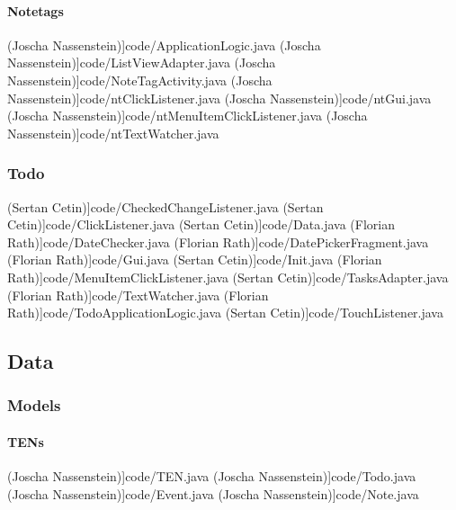 		\paragraph{Notetags}
 (Joscha Nassenstein)]{code/ApplicationLogic.java}
 (Joscha Nassenstein)]{code/ListViewAdapter.java}
 (Joscha Nassenstein)]{code/NoteTagActivity.java}
 (Joscha Nassenstein)]{code/ntClickListener.java}
 (Joscha Nassenstein)]{code/ntGui.java}
 (Joscha Nassenstein)]{code/ntMenuItemClickListener.java}
 (Joscha Nassenstein)]{code/ntTextWatcher.java}
	\subsubsection{Todo}
 (Sertan Cetin)]{code/CheckedChangeListener.java}
 (Sertan Cetin)]{code/ClickListener.java}
 (Sertan Cetin)]{code/Data.java}
 (Florian Rath)]{code/DateChecker.java}
 (Florian Rath)]{code/DatePickerFragment.java}
 (Florian Rath)]{code/Gui.java}
 (Sertan Cetin)]{code/Init.java}
 (Florian Rath)]{code/MenuItemClickListener.java}
 (Sertan Cetin)]{code/TasksAdapter.java}
 (Florian Rath)]{code/TextWatcher.java}
 (Florian Rath)]{code/TodoApplicationLogic.java}
 (Sertan Cetin)]{code/TouchListener.java}
\subsection{Data}
	\subsubsection{Models}
		\paragraph{TENs}
 (Joscha Nassenstein)]{code/TEN.java}
 (Joscha Nassenstein)]{code/Todo.java}
 (Joscha Nassenstein)]{code/Event.java}
 (Joscha Nassenstein)]{code/Note.java}

